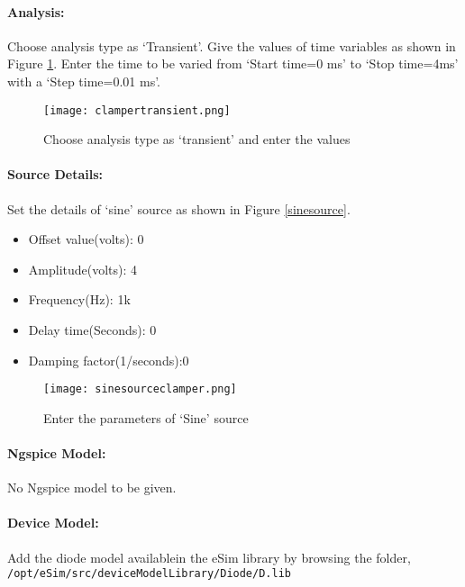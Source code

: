 %

\paragraph{Analysis:}Choose analysis type as `Transient'.  Give the values of time variables as shown in Figure \ref{clampertransient}. Enter the time to be varied from `Start time=0 ms' to `Stop time=4ms' with a `Step time=0.01 ms'.

\begin{figure}[h]
\centering
\texttt{[image: clampertransient.png]}
\caption{Choose analysis type as `transient' and enter the values}
\label{clampertransient}
\end{figure}

\paragraph{Source Details:} Set the details of `sine' source as shown in Figure \ref{sinesource}.
\begin{itemize}
\item
Offset value(volts): 0
\item
Amplitude(volts): 4
\item
Frequency(Hz): 1k
\item
Delay time(Seconds): 0
\item
Damping factor(1/seconds):0

\end{itemize}
\begin{figure}[h]
\centering
\texttt{[image: sinesourceclamper.png]}
\caption{Enter the parameters of `Sine' source}
\label{sinesourceclamper}
\end{figure}


\paragraph{Ngspice Model:} No Ngspice model to be given.

\paragraph{Device Model:} Add the  diode model availablein the eSim library by browsing the folder, \texttt{/opt/eSim/src/deviceModelLibrary/Diode/D.lib}

